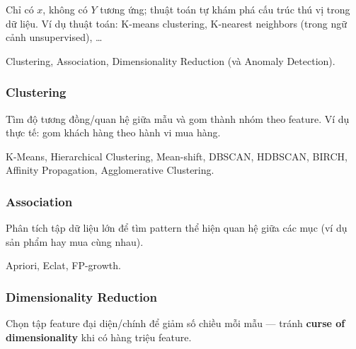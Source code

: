 \begin{ynghia}[title={Ví dụ trực giác}]
Chỉ có $x$, không có $Y$ tương ứng; thuật toán tự khám phá cấu trúc thú vị trong dữ liệu.
Ví dụ thuật toán: K-means clustering, K-nearest neighbors (trong ngữ cảnh unsupervised), \ldots
\end{ynghia}

\begin{phuongphap}[title={Ba nhóm tác vụ unsupervised}]
Clustering, Association, Dimensionality Reduction (và Anomaly Detection).
\end{phuongphap}

\subsubsection{Clustering}

\begin{ynghia}[title={Clustering}]
Tìm độ tương đồng/quan hệ giữa mẫu và gom thành nhóm theo feature.
Ví dụ thực tế: gom khách hàng theo hành vi mua hàng.
\end{ynghia}

\begin{phuongphap}[title={Mô hình clustering}]
K-Means, Hierarchical Clustering, Mean-shift, DBSCAN, HDBSCAN, BIRCH, Affinity Propagation, Agglomerative Clustering.
\end{phuongphap}

\subsubsection{Association}

\begin{ynghia}[title={Association / Market basket analysis}]
Phân tích tập dữ liệu lớn để tìm pattern thể hiện quan hệ giữa các mục (ví dụ sản phẩm hay mua cùng nhau).
\end{ynghia}

\begin{phuongphap}[title={Mô hình association}]
Apriori, Eclat, FP-growth.
\end{phuongphap}

\subsubsection{Dimensionality Reduction}

\begin{ynghia}[title={Giảm chiều}]
Chọn tập feature đại diện/chính để giảm số chiều mỗi mẫu --- tránh \textbf{curse of dimensionality} khi có hàng triệu feature.
\end{ynghia}

